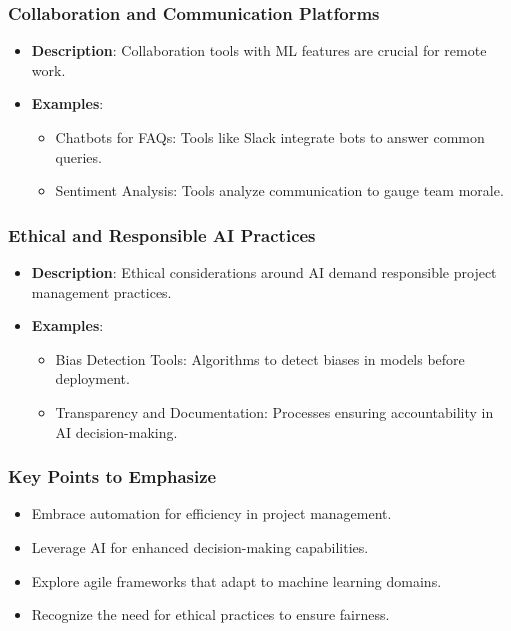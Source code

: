\documentclass[aspectratio=169]{beamer}
\begin{document}
\begin{frame}[fragile]
    \frametitle{Collaboration and Communication Platforms}
    \begin{itemize}
        \item \textbf{Description}: Collaboration tools with ML features are crucial for remote work.
        \item \textbf{Examples}:
        \begin{itemize}
            \item Chatbots for FAQs: Tools like Slack integrate bots to answer common queries.
            \item Sentiment Analysis: Tools analyze communication to gauge team morale.
        \end{itemize}
    \end{itemize}
\end{frame}

\begin{frame}[fragile]
    \frametitle{Ethical and Responsible AI Practices}
    \begin{itemize}
        \item \textbf{Description}: Ethical considerations around AI demand responsible project management practices.
        \item \textbf{Examples}:
        \begin{itemize}
            \item Bias Detection Tools: Algorithms to detect biases in models before deployment.
            \item Transparency and Documentation: Processes ensuring accountability in AI decision-making.
        \end{itemize}
    \end{itemize}
\end{frame}

\begin{frame}[fragile]
    \frametitle{Key Points to Emphasize}
    \begin{itemize}
        \item Embrace automation for efficiency in project management.
        \item Leverage AI for enhanced decision-making capabilities.
        \item Explore agile frameworks that adapt to machine learning domains.
        \item Recognize the need for ethical practices to ensure fairness.
    \end{itemize}
\end{frame}
\end{document}
